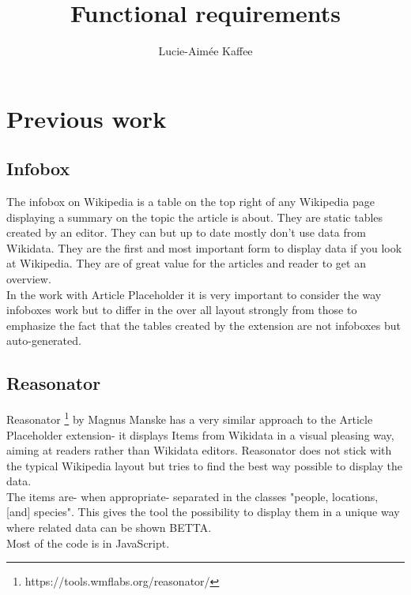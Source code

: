 \documentclass[11pt]{article}
\title {{Functional requirements}}
\author {Lucie-Aim\'{e}e Kaffee}
\date{}
\begin{document}
\section{Previous work}
\subsection{Infobox}
The infobox on Wikipedia is a table on the top right of any Wikipedia page displaying a summary on the topic the article is about. They are static tables created by an editor. They can but up to date mostly don't use data from Wikidata. They are the first and most important form to display data if you look at Wikipedia. They are of great value for the articles and reader to get an overview. \\
In the work with Article Placeholder it is very important to consider the way infoboxes work but to differ in the over all layout strongly from those to emphasize the fact that the tables created by the extension are not infoboxes but auto-generated. 

\subsection{Reasonator}
Reasonator \footnote{https://tools.wmflabs.org/reasonator/} by Magnus Manske has a very similar approach to the Article Placeholder extension- it displays Items from Wikidata in a visual pleasing way, aiming at readers rather than Wikidata editors. Reasonator does not stick with the typical Wikipedia layout but tries to find the best way possible to display the data. \\
The items are- when appropriate- separated in the classes   "people, locations, [and] species".  This gives the tool the possibility to display them in a unique way where related data can be shown BETTA. \\
Most of the code is in JavaScript. 
\end{document}
